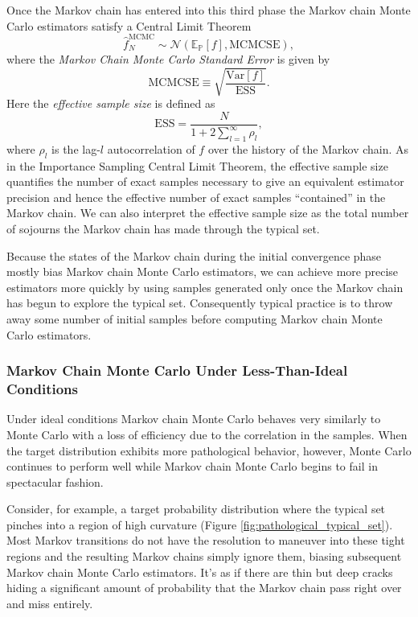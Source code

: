 \documentclass[11pt, oneside]{article}
\newcommand{\PP}{ \mathbb{P} }
\newcommand{\EE}{ \mathbb{E} }
\begin{document}
Once the Markov chain has entered into this third phase
the Markov chain Monte Carlo estimators satisfy a Central 
Limit Theorem
%
\begin{equation*}
\hat{f}_{N}^{\mathrm{MCMC}} \sim 
\mathcal{N} \! \left( \EE_{\PP} [ f ],
\mathrm{MCMCSE} \right),
\end{equation*}
%
where the \emph{Markov Chain Monte Carlo Standard Error} is 
given by
%
\begin{equation*}
\mathrm{MCMCSE} \equiv \sqrt{ \frac{ \mathrm{Var} [ f ] }{\mathrm{ESS} } }.
\end{equation*}
%
Here the \emph{effective sample size} is defined as
%
\begin{equation*}
\mathrm{ESS} = 
\frac{N}
{ 1 + 2 \sum_{l = 1}^{\infty} \rho_{l} },
\end{equation*}
%
where $\rho_{l}$ is the lag-$l$ autocorrelation of $f$ over the history
of the Markov chain.  As in the Importance Sampling Central Limit 
Theorem, the effective sample size quantifies the number of exact 
samples necessary to give an equivalent estimator precision and 
hence the effective number of exact samples ``contained'' in the 
Markov chain.  We can also interpret the effective sample size as 
the total number of sojourns the Markov chain has made through 
the typical set.

Because the states of the Markov chain during the initial convergence
phase mostly bias Markov chain Monte Carlo estimators, we can
achieve more precise estimators more quickly by using samples
generated only once the Markov chain has begun to explore the
typical set.  Consequently typical practice is to throw away some
number of initial samples before computing Markov chain Monte
Carlo estimators.

\subsubsection{Markov Chain Monte Carlo Under Less-Than-Ideal Conditions}

Under ideal conditions Markov chain Monte Carlo behaves
very similarly to Monte Carlo with a loss of efficiency due to
the correlation in the samples.  When the target distribution
exhibits more pathological behavior, however, Monte Carlo
continues to perform well while Markov chain Monte Carlo
begins to fail in spectacular fashion.

Consider, for example, a target probability distribution where
the typical set pinches into a region of high curvature
(Figure \ref{fig:pathological_typical_set}).  Most Markov
transitions do not have the resolution to maneuver into
these tight regions and the resulting Markov chains simply
ignore them, biasing subsequent Markov chain Monte Carlo
estimators.  It's as if there are thin but deep cracks hiding 
a significant amount of probability that the Markov chain 
pass right over and miss entirely.
\end{document}
